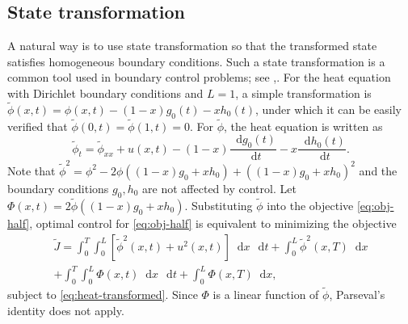 \documentclass[journal,twoside,web]{ieeecolor}
\newcommand{\state}{\phi}
\newcommand*\diff{\mathop{}\!\mathrm{d}}
\begin{document}
\label{sec:heat}
\subsection{State transformation}
\label{sec:state-transformation}
A natural way is to use state transformation so that the transformed state satisfies homogeneous boundary conditions.
Such a state transformation is a common tool used in boundary control problems; see \cite[Theorem 3.3.3]{curtain2012introduction},\cite{Ayamou2024finite}.
For the heat equation with Dirichlet boundary conditions and $L=1$, a simple transformation is $\tilde{\state}(x,t)=\state(x,t) - (1-x)g_0(t) - xh_0(t)$, 
under which it can be easily verified that $\tilde{\state}(0,t)=\tilde{\state}(1,t)=0$. 
For $\tilde{\state}$, the heat equation is written as
\begin{equation}\label{eq:heat-transformed}
	\tilde{\state}_t = \tilde{\state}_{xx} + u(x,t) -(1-x)\frac{\diff g_0(t)}{\diff t} - x\frac{\diff h_0(t)}{\diff t}.
\end{equation}
Note that $\tilde{\state}^2 = \state^2 - 2\state((1-x)g_0 + xh_0) + ((1-x)g_0 + xh_0)^2$ and the boundary conditions $g_0,h_0$ are not affected by control.
Let $\Phi(x,t) = 2\tilde{\state}((1-x)g_0 + xh_0)$.
Substituting $\tilde{\state}$ into the objective \eqref{eq:obj-half}, optimal control for \eqref{eq:obj-half} is equivalent to minimizing the objective 
\begin{equation}\label{eq:objective-approximate}
	\begin{aligned}
	\tilde{J} = \int_0^T \int_{0}^{L}\left[\tilde{\state}^2(x,t)+u^2(x,t)\right]\diff x\, \diff t  + \int_0^L\tilde{\state}^2(x,T)\diff x\\
	+ \int_0^T\int_{0}^{L}\Phi(x,t)\diff x\,\diff t 
	+\int_0^L\Phi(x,T)\diff x,
\end{aligned}
\end{equation}
subject to \eqref{eq:heat-transformed}. 
Since $\Phi$ is a linear function of  $\tilde{\state}$, Parseval's identity does not apply.
\end{document}
